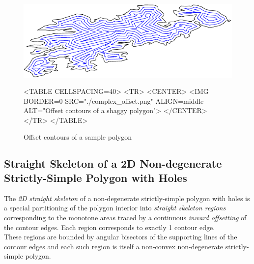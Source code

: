 \begin{figure}[htbp]
\begin{ccTexOnly}
\begin{center}
\includegraphics{Straight_skeleton_2/complex_offset} %
\end{center}
\end{ccTexOnly}
\begin{ccHtmlOnly}
<TABLE CELLSPACING=40>
<TR>
<CENTER>
<IMG BORDER=0 SRC="./complex_offset.png" ALIGN=middle ALT="Offset contours of a shaggy polygon">
</CENTER>
</TR>
</TABLE>
\end{ccHtmlOnly}
\caption{Offset contours of a sample polygon
\label{Offsets}}
\end{figure}

\subsection{Straight Skeleton of a 2D Non-degenerate Strictly-Simple Polygon with Holes}
 
The {\em 2D straight skeleton} of a non-degenerate strictly-simple polygon with holes \cite{aaag-ntsp-95} is a special partitioning of the polygon interior into {\em straight skeleton regions} corresponding to the monotone areas traced by a continuous \textit{inward offsetting} of the contour edges. Each region corresponds to exactly 1 contour edge.\\
These regions are bounded by angular bisectors of the supporting lines of the contour edges and each such region is itself a non-convex non-degenerate strictly-simple polygon.

